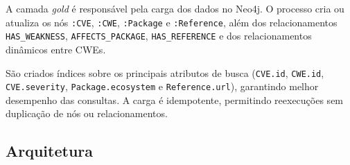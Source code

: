 A camada \textit{gold} é responsável pela carga dos dados no Neo4j. O processo cria ou atualiza os nós \texttt{:CVE}, \texttt{:CWE}, \texttt{:Package} e \texttt{:Reference}, além dos relacionamentos \texttt{HAS\_WEAKNESS}, \texttt{AFFECTS\_PACKAGE}, \texttt{HAS\_REFERENCE} e dos relacionamentos dinâmicos entre CWEs.

São criados índices sobre os principais atributos de busca (\texttt{CVE.id}, \texttt{CWE.id}, \texttt{CVE.severity}, \texttt{Package.ecosystem} e \texttt{Reference.url}), garantindo melhor desempenho das consultas. A carga é idempotente, permitindo reexecuções sem duplicação de nós ou relacionamentos.

\subsection{Arquitetura}


